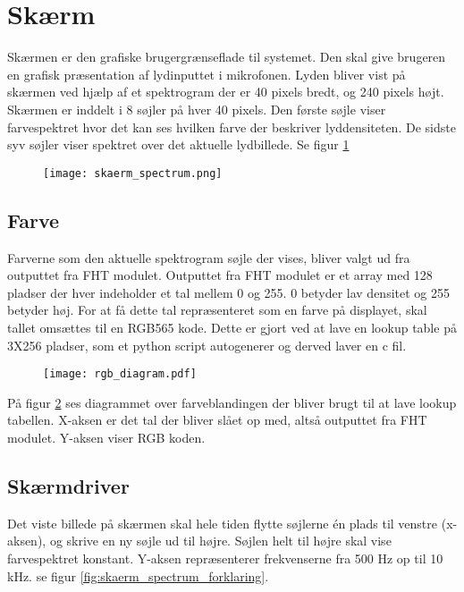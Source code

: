 



\section{Skærm}
Skærmen er den grafiske brugergrænseflade til systemet. Den skal give brugeren en grafisk præsentation af lydinputtet i mikrofonen. Lyden bliver vist på skærmen ved hjælp af et spektrogram der er 40 pixels bredt, og 240 pixels højt.
Skærmen er inddelt i 8 søjler på hver 40 pixels. Den første søjle viser farvespektret hvor det kan ses hvilken farve der beskriver lyddensiteten. De sidste syv søjler viser spektret over det aktuelle lydbillede. Se figur \ref{fig:skaerm_spectrum}

\begin{figure} [H]
	\centering
	\texttt{[image: skaerm\_spectrum.png]}
	\label{fig:skaerm_spectrum}
\end{figure}

\subsection{Farve}
Farverne som den aktuelle spektrogram søjle der vises, bliver valgt ud fra outputtet fra FHT modulet. Outputtet fra FHT modulet er et array med 128 pladser der hver indeholder et tal mellem 0 og 255. 0 betyder lav densitet og 255 betyder høj.
For at få dette tal repræsenteret som en farve på displayet, skal tallet omsættes til en RGB565 kode.
Dette er gjort ved at lave en lookup table på 3X256 pladser, som et python script autogenerer og derved laver en c fil.

\begin{figure} [H]
	\centering
	\texttt{[image: rgb\_diagram.pdf]}
	\label{fig:rgb_diagram}
\end{figure}


På figur \ref{fig:rgb_diagram} ses diagrammet over farveblandingen der bliver brugt til at lave lookup tabellen. X-aksen er det tal der bliver slået op med, altså outputtet fra FHT modulet. Y-aksen viser RGB koden.


\subsection{Skærmdriver}
Det viste billede på skærmen skal hele tiden flytte søjlerne én plads til venstre (x-aksen), og skrive en ny søjle ud til højre. Søjlen helt til højre skal vise farvespektret konstant.
Y-aksen repræsenterer frekvenserne fra 500 Hz op til 10 kHz. se figur \ref{fig:skaerm_spectrum_forklaring}.


